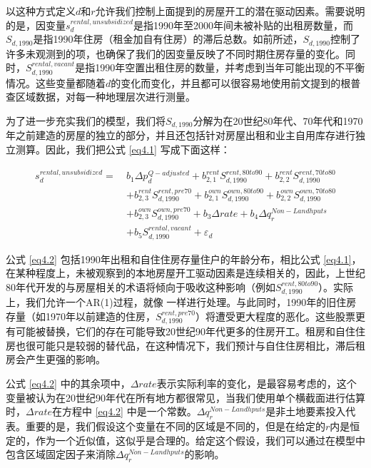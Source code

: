 \documentclass[lang=cn,11pt,a4paper]{paper}
\begin{document}
以这种方式定义$d$和$r$允许我们控制上面提到的房屋开工的潜在驱动因素。需要说明的是，因变量$s_{d}^{rental,unsubsidized}$是指1990年至2000年间未被补贴的出租房数量，而$S_{d,1990}$是指1990年住房（租金加自有住房）的滞后总数。如前所述，$S_{d, 1990}$控制了许多未观测到的项，也确保了我们的因变量反映了不同时期住房存量的变化。同时，$S_{d, 1990}^{rental, vacant}$是指1990年空置出租住房的数量，并考虑到当年可能出现的不平衡情况。这些变量都随着$d$的变化而变化，并且都可以很容易地使用前文提到的根普查区域数据，对每一种地理层次进行测量。

为了进一步充实我们的模型，我们将$S_{d,1990}$分解为在20世纪80年代、70年代和1970年之前建造的房屋的独立的部分，并且还包括针对房屋出租和业主自用库存进行独立测算。因此，我们把公式 \eqref{eq4.1} 写成下面这样：

\begin{equation}\label{eq4.2}
\begin{aligned}
  s_{d}^{rental,unsubsidized}=\ & b_{1} \Delta p_{d}^{Q-adjusted}+b_{2,1}^{rent} S_{d, 1990}^{rent, 80 t o 90}+b_{2,2}^{rent} S_{d, 1990}^{rent, 70 to 80} \\
  &+b_{2,3}^{rent} S_{d, 1990}^{rent, pre 70}+b_{2,1}^{own} S_{d, 1990}^{own, 80 to 90}+b_{2,2}^{own} S_{d, 1990}^{own, 70 to 80} \\
  &+b_{2,3}^{own} S_{d, 1990}^{own, pre 70}+b_{3} \Delta rate+b_{4} \Delta q_{r}^{Non-Landhputs} \\
  &+b_{5} S_{d, 1990}^{rental,vacant}+\varepsilon_{d}
  \end{aligned}
\end{equation}

公式 \eqref{eq4.2} 包括1990年出租和自住住房存量住户的年龄分布，相比公式 \eqref{eq4.1}，在某种程度上，未被观察到的本地房屋开工驱动因素是连续相关的，因此，上世纪80年代开发的与房屋相关的术语将倾向于吸收这种影响（例如$S_{d, 1990}^{rent, 80 to 90}$）。实际上，我们允许一个AR(1)过程，就像 \cite{Mayer200085} 一样进行处理。与此同时，1990年的旧住房存量（如1970年以前建造的住房，$S_{d, 1990}^{rent, pre70}$）将遭受更大程度的恶化。这些股票更有可能被替换，它们的存在可能导致20世纪90年代更多的住房开工。租房和自住住房也很可能只是较弱的替代品，在这种情况下，我们预计与自住住房相比，滞后租房会产生更强的影响。

公式 \eqref{eq4.2} 中的其余项中，$\Delta rate$表示实际利率的变化，是最容易考虑的，这个变量被认为在20世纪90年代在所有地方都很常见，当我们使用单个横截面进行估算时，$\Delta rate$在方程中 \eqref{eq4.2} 中是一个常数。$\Delta q_{r}^{Non-Landhputs}$是非土地要素投入代表。重要的是，我们假设这个变量在不同的区域是不同的，但是在给定的$r$内是恒定的，作为一个近似值，这似乎是合理的。给定这个假设，我们可以通过在模型中包含区域固定因子来消除$\Delta q_{r}^{Non-Landhputs}$的影响。
\end{document}
